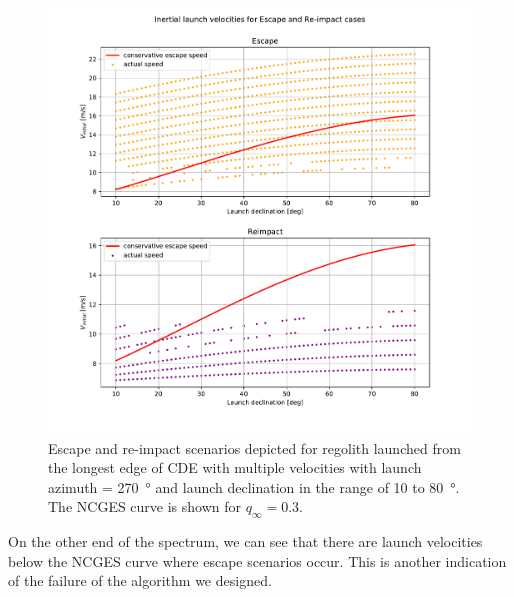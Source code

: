 \begin{figure}[htb]
\centering
\captionsetup{justification=centering}
\includegraphics[width=\textwidth, height=0.5\textheight, keepaspectratio=true]{non_conservative_escape_speed/qinfinity_dot3_escape_reimpact_multipleVelocities_corrected.pdf}
\caption{Escape and re-impact scenarios depicted for regolith launched from the longest edge of \gls{CDE} with multiple velocities with launch azimuth = \SI{270}{\degree} and launch declination in the range of 10 to \SI{80}{\degree}. The \gls{NCGES} curve is shown for $q_\infty = 0.3$.}
\label{fig:non_conservative_multiple_velocities_qinfinity_0.3}
\end{figure}
\FloatBarrier
On the other end of the spectrum, we can see that there are launch velocities below the \gls{NCGES} curve where escape scenarios occur. This is another indication of the failure of the algorithm we designed.
%
\newline\newline
%
